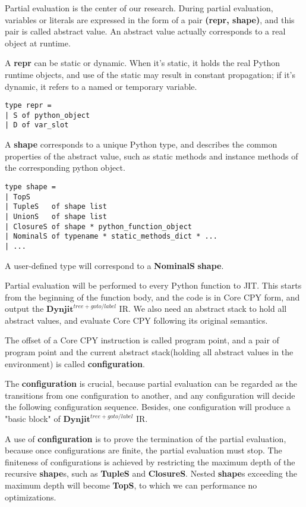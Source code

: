 \documentclass[conference]{IEEEtran}
\begin{document}
Partial evaluation is the center of our research.
During partial evaluation, variables or literals are expressed in the form of a pair \textbf{(repr, shape)}, and this pair is called abstract value.
An abstract value actually corresponds to a real object at runtime.

A \textbf{repr} can be static or dynamic. When it's static, it holds the real Python runtime objects, and use of the static  may
result in constant propagation; if it's dynamic, it refers to a named or temporary variable. 

\lstset{language=Caml, showlines=true, mathescape=true}
\begin{lstlisting}
type repr =
| S of python_object
| D of var_slot
\end{lstlisting}

A \textbf{shape} corresponds to a unique Python type, and describes the common properties of the abstract value,
such as static methods and instance methods of the corresponding python object.

\lstset{language=Caml, showlines=true, mathescape=true}
\begin{lstlisting}
type shape =
| TopS
| TupleS   of shape list
| UnionS   of shape list
| ClosureS of shape * python_function_object
| NominalS of typename * static_methods_dict * ... 
| ...
\end{lstlisting}

A user-defined type will correspond to a \textbf{NominalS} \textbf{shape}.

Partial evaluation will be performed to every Python function to JIT. This starts from the beginning
of the function body, and the code is in Core CPY form, and output the $\mathbf{Dynjit}^{tree+goto/label}$ IR.
We also need an abstract stack to hold all abstract values, and evaluate Core CPY following its original semantics.

The offset of a Core CPY instruction is called program point, and a pair of program point and the current abstract stack(holding all abstract values in the environment)
is called \textbf{configuration}.

The \textbf{configuration} is crucial, because partial evaluation can be regarded as the transitions from one configuration to another,
and any configuration will decide the following configuration sequence. Besides, one configuration will produce a
"basic block" of $\mathbf{Dynjit}^{tree+goto/label}$ IR.

A use of \textbf{configuration} is to prove the termination of the partial evaluation,
because once configurations are finite, the partial evaluation must stop.
The finiteness of configurations is achieved by restricting the maximum depth of the recursive \textbf{shape}s, such as \textbf{TupleS} and \textbf{ClosureS}.
Nested \textbf{shape}s exceeding the maximum depth will become \textbf{TopS}, to which we can performance no optimizations.
\end{document}
